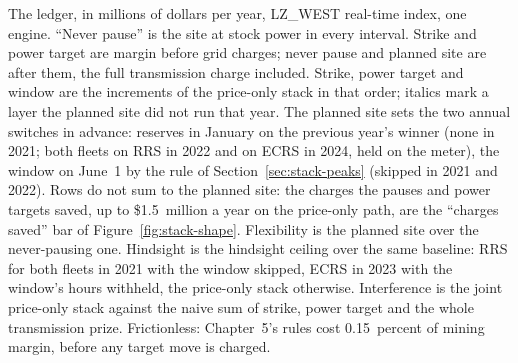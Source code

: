 \begin{table}[tb]
  \caption{The ledger, in millions of dollars per year, LZ\_WEST real-time index, one engine. ``Never pause'' is the site at stock power in every interval. Strike and power target are margin before grid charges; never pause and planned site are after them, the full transmission charge included. Strike, power target and window are the increments of the price-only stack in that order; italics mark a layer the planned site did not run that year. The planned site sets the two annual switches in advance: reserves in January on the previous year's winner (none in 2021; both fleets on RRS in 2022 and on ECRS in 2024, held on the meter), the window on June~1 by the rule of Section~\ref{sec:stack-peaks} (skipped in 2021 and 2022). Rows do not sum to the planned site: the charges the pauses and power targets saved, up to \$1.5~million a year on the price-only path, are the ``charges saved'' bar of Figure~\ref{fig:stack-shape}. Flexibility is the planned site over the never-pausing one. Hindsight is the hindsight ceiling over the same baseline: RRS for both fleets in 2021 with the window skipped, ECRS in 2023 with the window's hours withheld, the price-only stack otherwise. Interference is the joint price-only stack against the naive sum of strike, power target and the whole transmission prize. Frictionless: Chapter~5's rules cost 0.15~percent of mining margin, before any target move is charged.} %
  \label{tab:stack-ledger}
\end{table}

